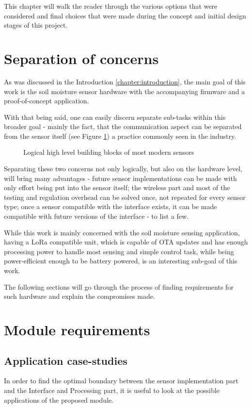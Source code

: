 
This chapter will walk the reader through the various options that were considered and final choices that were made during the concept and initial design stages of this project.

\section{Separation of concerns}

As was discussed in the Introduction \ref{chapter:introduction}, the main goal of this work is the soil moisture sensor hardware with the accompanying firmware and a proof-of-concept application.

With that being said, one can easily discern separate sub-tasks within this broader goal - mainly the fact, that the communication aspect can be separated from the sensor itself (see Figure \ref{fig:device-split}) a practice commonly seen in the industry.

\begin{figure}
    
    \caption{\label{fig:device-split} Logical high level building blocks of most modern sensors}
\end{figure}

Separating these two concerns not only logically, but also on the hardware level, will bring many advantages - future sensor implementations can be made with only effort being put into the sensor itself; the wireless part and most of the testing and regulation overhead can be solved once, not repeated for every sensor type; once a sensor compatible with the interface exists, it can be made compatible with future versions of the interface - to list a few.

While this work is mainly concerned with the soil moisture sensing application, having a LoRa compatible unit, which is capable of OTA updates and has enough processing power to handle most sensing and simple control task, while being power-efficient enough to be battery powered, is an interesting sub-goal of this work.

The following sections will go through the process of finding requirements for such hardware and explain the compromises made.

\section{Module requirements}
\subsection{Application case-studies}
In order to find the optimal boundary between the sensor implementation part and the Interface and Processing part, it is useful to look at the possible applications of the proposed module.

